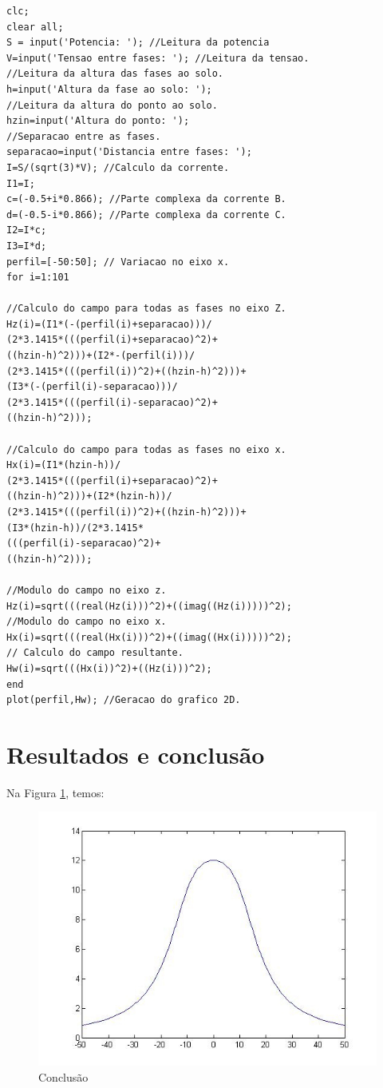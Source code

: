 \documentclass[12pt,a4paper]{article}
\begin{document}
\begin{lstlisting}
clc;
clear all;
S = input('Potencia: '); //Leitura da potencia
V=input('Tensao entre fases: '); //Leitura da tensao.
//Leitura da altura das fases ao solo.
h=input('Altura da fase ao solo: '); 
//Leitura da altura do ponto ao solo.
hzin=input('Altura do ponto: ');
//Separacao entre as fases.
separacao=input('Distancia entre fases: '); 
I=S/(sqrt(3)*V); //Calculo da corrente.
I1=I;
c=(-0.5+i*0.866); //Parte complexa da corrente B.
d=(-0.5-i*0.866); //Parte complexa da corrente C.
I2=I*c;
I3=I*d;
perfil=[-50:50]; // Variacao no eixo x.
for i=1:101

//Calculo do campo para todas as fases no eixo Z.
Hz(i)=(I1*(-(perfil(i)+separacao)))/
(2*3.1415*(((perfil(i)+separacao)^2)+
((hzin-h)^2)))+(I2*-(perfil(i)))/
(2*3.1415*(((perfil(i))^2)+((hzin-h)^2)))+
(I3*(-(perfil(i)-separacao)))/
(2*3.1415*(((perfil(i)-separacao)^2)+
((hzin-h)^2))); 

//Calculo do campo para todas as fases no eixo x.
Hx(i)=(I1*(hzin-h))/
(2*3.1415*(((perfil(i)+separacao)^2)+
((hzin-h)^2)))+(I2*(hzin-h))/
(2*3.1415*(((perfil(i))^2)+((hzin-h)^2)))+
(I3*(hzin-h))/(2*3.1415*
(((perfil(i)-separacao)^2)+
((hzin-h)^2))); 

//Modulo do campo no eixo z.
Hz(i)=sqrt(((real(Hz(i)))^2)+((imag((Hz(i)))))^2); 
//Modulo do campo no eixo x.
Hx(i)=sqrt(((real(Hx(i)))^2)+((imag((Hx(i)))))^2); 
// Calculo do campo resultante.
Hw(i)=sqrt(((Hx(i))^2)+((Hz(i)))^2); 
end
plot(perfil,Hw); //Geracao do grafico 2D.
\end{lstlisting}

\newpage
\section{Resultados e conclusão}
\lipsum[1-1]
Na Figura \ref{fig:fig3}, temos:

\begin{figure}[!ht]
\centering \includegraphics[scale=0.5]{figuras/figura3.png}
\caption{Conclusão} \label{fig:fig3}
\end{figure}
\end{document}
